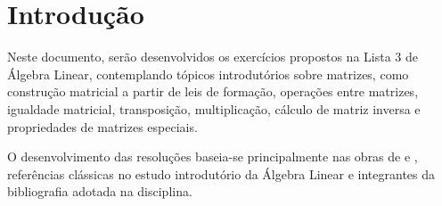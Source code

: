 \section{Introdução}

Neste documento, serão desenvolvidos os exercícios propostos na Lista 3 de
Álgebra Linear, contemplando tópicos introdutórios sobre matrizes, como
construção matricial a partir de leis de formação, operações entre matrizes,
igualdade matricial, transposição, multiplicação, cálculo de matriz inversa e
propriedades de matrizes especiais.

O desenvolvimento das resoluções baseia-se principalmente nas obras de
\citeauthor{steinbruch_linear} \cite{steinbruch_linear} e
\citeauthor{boldrini_linear} \cite{boldrini_linear}, referências clássicas no
estudo introdutório da Álgebra Linear e integrantes da bibliografia adotada na
disciplina.
